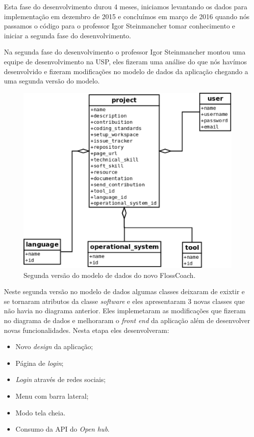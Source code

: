 Esta fase do desenvolvimento durou 4 meses, iniciamos levantando os dados para implementação
em dezembro de 2015 e concluímos em março de 2016 quando nós passamos o código para o
professor Igor Steinmancher tomar conhecimento e iniciar a segunda fase do desenvolvimento.  


Na segunda fase do desenvolvimento o professor Igor Steinmancher montou uma equipe 
de desenvolvimento na USP, eles fizeram uma análise do que nós havímos desenvolvido
e fizeram modificações no modelo de dados da aplicação chegando a uma segunda versão do 
modelo.

\begin{figure}[h]
	\centering
	\label{fig:diagrama_fase2}
		\includegraphics[keepaspectratio=true,scale=0.3]{figuras/diagrama_fase2.eps}
	\caption{Segunda versão do modelo de dados do novo FlossCoach.}
\end{figure}

Neste segunda versão no modelo de dados algumas classes deixaram de exixtir e se tornaram
atributos da classe \textit{software} e eles apresentaram 3 novas classes que não havia
no diagrama anterior. Eles implemetaram as modificações que fizeram no diagrama de dados
e melhoraram o \textit{front end} da aplicação além de desenvolver novas funcionalidades. 
Nesta etapa eles desenvolveram:
\begin{itemize}
\item Novo \textit{design} da aplicação;
\item Página de \textit{login}; 
\item \textit{Login} através de redes sociais;
\item Menu com barra lateral;
\item Modo tela cheia.
\item Consumo da API do \textit{Open hub}.
\end{itemize}

